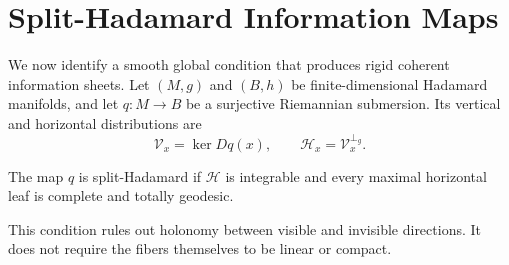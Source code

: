 \section{Split-Hadamard Information Maps}
\label{sec:split-hadamard}

We now identify a smooth global condition that produces rigid coherent
information sheets.  Let \((M,g)\) and \((B,h)\) be finite-dimensional
Hadamard manifolds, and let \(q:M\to B\) be a surjective Riemannian
submersion.  Its vertical and horizontal distributions are
\[
  \mathcal V_x=\ker Dq(x),
  \qquad
  \mathcal H_x=\mathcal V_x^{\perp_g}.
\]

\begin{definition}
\label{def:split-hadamard}
\mbox{}\par\noindent
The map \(q\) is split-Hadamard if \(\mathcal H\) is integrable and every
maximal horizontal leaf is complete and totally geodesic.
\end{definition}

This condition rules out holonomy between visible and invisible directions.
It does not require the fibers themselves to be linear or compact.

